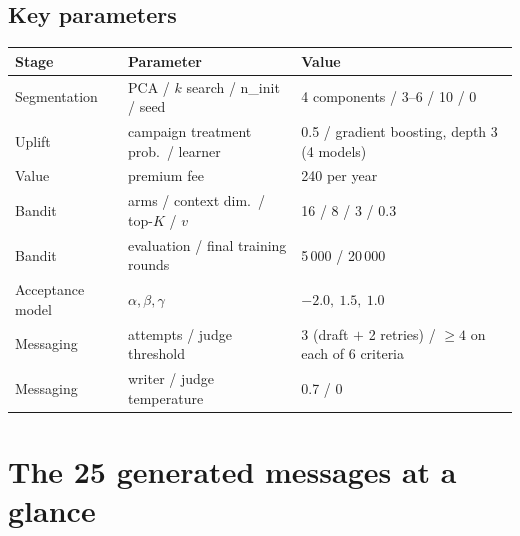 \documentclass[11pt,a4paper]{article}
\newcommand{\eur}{\texttt{\texteuro}}
\begin{document}
\subsection*{Key parameters}
\begin{center}
\small
\begin{tabular}{@{}llp{7.8cm}@{}}
\toprule
\textbf{Stage} & \textbf{Parameter} & \textbf{Value}\\
\midrule
Segmentation & PCA / $k$ search / n\_init / seed & 4 components / 3--6 / 10 / 0\\
Uplift & campaign treatment prob.\ / learner & 0.5 / gradient boosting, depth 3 (4 models)\\
Value & premium fee & \eur 240 per year\\
Bandit & arms / context dim.\ / top-$K$ / $v$ & 16 / 8 / 3 / 0.3\\
Bandit & evaluation / final training rounds & 5\,000 / 20\,000\\
Acceptance model & $\alpha,\beta,\gamma$ & $-2.0,\ 1.5,\ 1.0$\\
Messaging & attempts / judge threshold & 3 (draft $+$ 2 retries) / $\geq 4$ on each of 6 criteria\\
Messaging & writer / judge temperature & 0.7 / 0\\
\bottomrule
\end{tabular}
\end{center}

\appendix
\section{The 25 generated messages at a glance}
\end{document}
